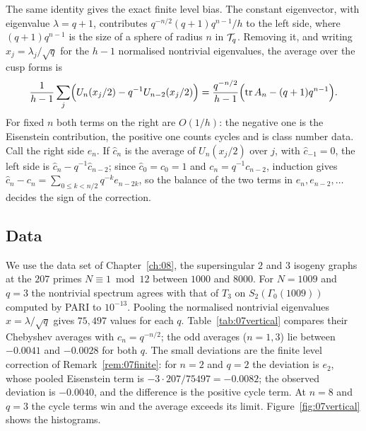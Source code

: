 \begin{remark}\label{rem:07finite}
The same identity gives the exact finite level bias. The constant eigenvector, with eigenvalue $\lambda=q+1$, contributes $q^{-n/2}(q+1)q^{n-1}/h$ to the left side, where $(q+1)q^{n-1}$ is the size of a sphere of radius $n$ in $\mathcal{T}_q$. Removing it, and writing $x_j=\lambda_j/\sqrt q$ for the $h-1$ normalised nontrivial eigenvalues, the average over the cusp forms is
\[
\frac{1}{h-1}\sum_{j}\Bigl(U_n(x_j/2)-q^{-1}U_{n-2}(x_j/2)\Bigr)=\frac{q^{-n/2}}{h-1}\Bigl(\operatorname{tr} A_n-(q+1)q^{n-1}\Bigr).
\]
For fixed $n$ both terms on the right are $O(1/h)$: the negative one is the Eisenstein contribution, the positive one counts cycles and is class number data. Call the right side $e_n$. If $\hat c_n$ is the average of $U_n(x_j/2)$ over $j$, with $\hat c_{-1}=0$, the left side is $\hat c_n-q^{-1}\hat c_{n-2}$; since $\hat c_0=c_0=1$ and $c_n=q^{-1}c_{n-2}$, induction gives $\hat c_n-c_n=\sum_{0\le k<n/2}q^{-k}e_{n-2k}$, so the balance of the two terms in $e_n,e_{n-2},\dots$ decides the sign of the correction.
\end{remark}

\subsection{Data}

We use the data set of Chapter~\ref{ch:08}, the supersingular $2$ and $3$ isogeny graphs at the $207$ primes $N\equiv1\bmod12$ between $1000$ and $8000$. For $N=1009$ and $q=3$ the nontrivial spectrum agrees with that of $T_3$ on $S_2(\Gamma_0(1009))$ computed by PARI to $10^{-13}$. Pooling the normalised nontrivial eigenvalues $x=\lambda/\sqrt q$ gives $75{,}497$ values for each $q$. Table~\ref{tab:07vertical} compares their Chebyshev averages with $c_n=q^{-n/2}$; the odd averages ($n=1,3$) lie between $-0.0041$ and $-0.0028$ for both $q$. The small deviations are the finite level correction of Remark~\ref{rem:07finite}: for $n=2$ and $q=2$ the deviation is $e_2$, whose pooled Eisenstein term is $-3\cdot207/75497=-0.0082$; the observed deviation is $-0.0040$, and the difference is the positive cycle term. At $n=8$ and $q=3$ the cycle terms win and the average exceeds its limit. Figure~\ref{fig:07vertical} shows the histograms.

